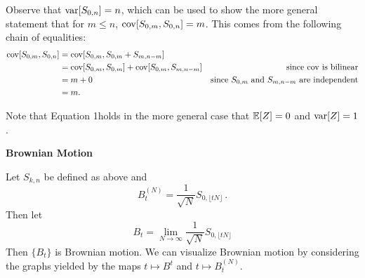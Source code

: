 \documentclass[../../../Master/AppliedStochastics.tex]{subfiles}
\begin{document}
Observe that $\operatorname{var}[S_{0, n}] = n$,
    which can be used to show the more general statement that for $m \leq n$,
    $\operatorname{cov}[S_{0, m}, S_{0, n}] = m$.
This comes from the following chain of equalities:
\begin{align*}
\operatorname{cov}[S_{0, m},S_{0, n}] &= \operatorname{cov}[S_{0, m},S_{0, m} + S_{m, n-m}]\\
                        &= \operatorname{cov}[S_{0, m}, S_{0, m}] + \operatorname{cov}[S_{0, m}, S_{m, n-m}]
                            &\text{since $\operatorname{cov}$ is bilinear}\\
                        &= m + 0 
                            &\text{since $S_{0, m}$ and $S_{m, n-m}$
                                    are independent}\\
                        &= m.
\end{align*}


Note that Equation 1\addref holds in the more general case that
    $\mathbb{E}[Z]=0$ and $\operatorname{var}[Z] = 1$.


\textbf{\Large Brownian Motion}


Let $S_{k, n}$ be defined as above and
\begin{equation*} 
    B_t^{(N)} = \frac{1}{\sqrt{N}} S_{0, \lfloor t N\rfloor}\,.
\end{equation*}
Then let
\begin{equation*}
    B_t = \lim_{N \to \infty} \frac{1}{\sqrt{N}} S_{0, \lfloor t N\rfloor}
\end{equation*}
Then $\{B_t\}$ is Brownian motion.
We can visualize Brownian motion by considering the graphs
    yielded by the maps $t \mapsto B^t$ and $t\mapsto B_t^{(N)}$.
\end{document}
